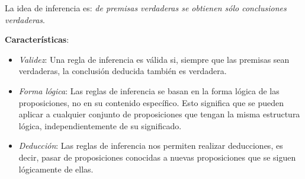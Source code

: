 La idea de inferencia es: \textit{de premisas verdaderas se obtienen sólo conclusiones verdaderas}.

\textbf{Características}:

\begin{itemize}
	\item \textit{Validez}: Una regla de inferencia es válida si, siempre que las premisas sean verdaderas, la conclusión deducida también es verdadera.
	\item \textit{Forma lógica}: Las reglas de inferencia se basan en la forma lógica de las proposiciones, no en su contenido específico. Esto significa que se pueden aplicar a cualquier conjunto de proposiciones que tengan la misma estructura lógica, independientemente de su significado.
	\item \textit{Deducción}: Las reglas de inferencia nos permiten realizar deducciones, es decir, pasar de proposiciones conocidas a nuevas proposiciones que se siguen lógicamente de ellas.
\end{itemize}


